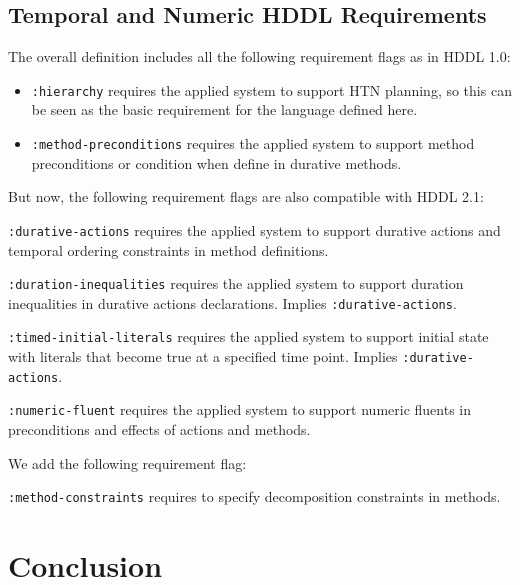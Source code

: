 \documentclass[letterpaper]{article} %
\begin{document}
\subsection{Temporal and Numeric HDDL Requirements}
\label{Sec:Requirements}
The overall definition includes all the following requirement flags as in HDDL 1.0:
\begin{itemize}
 \item \verb+:hierarchy+ requires the applied system to support HTN planning, so this can be seen as the basic requirement for the language defined here.
 \item \verb+:method-preconditions+ requires the applied system to support method preconditions or condition when define in durative methods.
\end{itemize}
But now, the following requirement flags are also compatible with HDDL 2.1:
\begin{description}
 \item \verb+:durative-actions+ requires the applied system to support durative actions and temporal ordering constraints in method definitions.
 \item \verb+:duration-inequalities+ requires the applied system to support duration inequalities in durative actions declarations. Implies \verb+:durative-actions+.
 \item \verb+:timed-initial-literals+ requires the applied system to support initial state with literals that become true at a specified time point. Implies \verb+:durative-actions+.
 \item \verb+:numeric-fluent+ requires the applied system to support numeric fluents in preconditions and effects of actions and methods.
 \end{description}
 We add the following requirement flag:
\begin{description}
\item \verb+:method-constraints+ requires to specify decomposition constraints in methods.
 \end{description}

\section{Conclusion}
\label{sec:conclusion}

\end{document}
